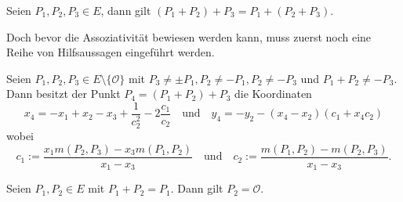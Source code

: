 \begin{theorem}
    Seien \(P_1,P_2,P_3\in E\), dann gilt \((P_1+P_2)+P_3=P_1+(P_2+P_3)\).
\end{theorem}

Doch bevor die Assoziativität bewiesen werden kann, muss zuerst noch eine Reihe von Hilfsaussagen eingeführt werden.

\begin{lemma}\label{lem:dreipunktsumme}
    Seien $P_1,P_2,P_3\in E\setminus{\{\mathcal{O}\}}$ mit $P_3\neq \pm P_1, P_2\neq -P_1, P_2\neq -P_3$ und $P_1+P_2\neq -P_3$. Dann besitzt der Punkt $P_4=(P_1+P_2)+P_3$ die Koordinaten
    \[
        x_4=-x_1+x_2-x_3+\frac{1}{c_2^2}-2\frac{c_1}{c_2} \quad \text{und}\quad y_4 = -y_2-(x_4-x_2)(c_1+x_4c_2)
    \]
    wobei
    \[
        c_1 := \frac{x_1m(P_2,P_3)-x_3m(P_1,P_2)}{x_1-x_3} \quad \text{und}\quad c_2:=\frac{m(P_1,P_2)-m(P_2,P_3)}{x_1-x_3}.
    \]
\end{lemma}

\begin{hilfssatz}\label{hilfs:fixpunkt-addition}
    Seien $P_1,P_2\in E$ mit $P_1+P_2=P_1$. Dann gilt $P_2 =\mathcal{O}$.
\end{hilfssatz}

